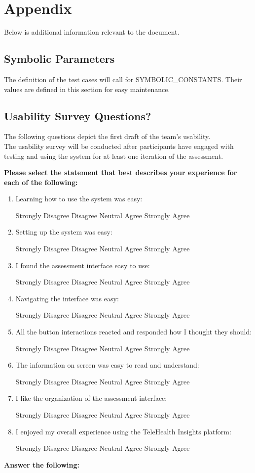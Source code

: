\documentclass[12pt, titlepage]{article}
\begin{document}
				


\newpage


\newpage

\section{Appendix}

Below is additional information relevant to the document.

\subsection{Symbolic Parameters}

The definition of the test cases will call for SYMBOLIC\_CONSTANTS.
Their values are defined in this section for easy maintenance.

\subsection{Usability Survey Questions?}
The following questions depict the first draft of the team's usability.\\
The usability survey will be conducted after participants have engaged with testing and using the system for at least one iteration of the assessment.\\

\newcommand{\likertScale}{
    \begin{center}
        Strongly Disagree \hfill Disagree \hfill Neutral \hfill Agree \hfill Strongly Agree
    \end{center}
}

\newcommand{\insertAnswerHere}{
  \begin{tcolorbox}[width=0.5\textwidth,
    colframe=black,
    colback=white,
    boxrule=0.1mm,
    sharp corners]
  \textit{Insert answer here...}
  \end{tcolorbox}
}

\textbf{Please select the statement that best describes your experience for each of the following:}
\begin{enumerate}
  \item Learning how to use the system was easy:\likertScale
  \item Setting up the system was easy:\likertScale
  \item I found the assessment interface easy to use:\likertScale
  \item Navigating the interface was easy:\likertScale
  \item All the button interactions reacted and responded how I thought they should:\likertScale
  \item The information on screen was easy to read and understand:\likertScale
  \item I like the organization of the assessment interface:\likertScale
  \item I enjoyed my overall experience using the TeleHealth Insights platform:\likertScale
\end{enumerate}
\textbf{Answer the following:}
\end{document}
